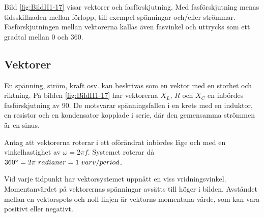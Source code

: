 
Bild \ref{fig:BildII1-17} visar vektorer och fasförskjutning.
Med fasförskjutning menas tidsskillnaden mellan förlopp, till exempel spänningar
och/eller strömmar.
Fasförskjutningen mellan vektorerna kallas även fasvinkel och uttrycks som ett
gradtal mellan 0 och 360\degree.

\newpage

\subsection{Vektorer}

En spänning, ström, kraft osv. kan beskrivas som en vektor med en storhet och
riktning.
På bilden \ref{fig:BildII1-17} har vektorerna \(X_L\), \(R\) och \(X_C\) en
inbördes fasförskjutning av 90\degree.
De motsvarar spänningsfallen i en krets med en induktor, en resistor och en
kondensator kopplade i serie, där den gemensamma strömmen är en sinus.

Antag att vektorerna roterar i ett oförändrat inbördes läge och med en
vinkelhastighet av \(\omega= 2\pi f\).
Systemet roterar då \(360\degree = 2\pi\ radianer = 1\ varv/period\).

Vid varje tidpunkt har vektorsystemet uppnått en viss vridningsvinkel.
Momentanvärdet på vektorernas spänningar avsätts till höger i bilden.
Avståndet mellan en vektorspets och noll-linjen är vektorns momentana värde,
som kan vara positivt eller negativt.
